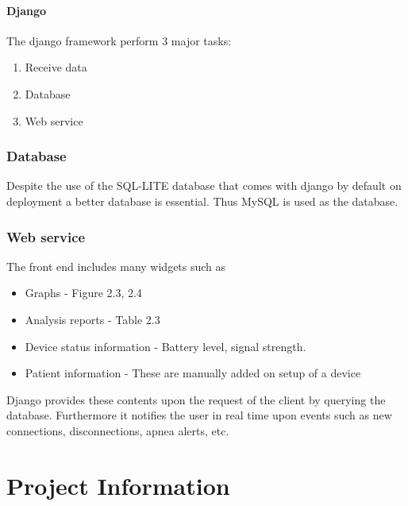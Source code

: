 \documentclass{report}
\begin{document}
\subsubsection{Django}

The django framework perform 3 major tasks:

\begin{enumerate}
    \item Receive data
    \item Database  
    \item Web service
\end{enumerate}


\subsection{Database}
Despite the use of the SQL-LITE database that comes with django by default on deployment a better database is essential. Thus MySQL is used as the database. 

\subsection{Web service} 
The front end includes many widgets such as \begin{itemize}
    \item Graphs - Figure 2.3, 2.4
    \item Analysis reports - Table 2.3
    \item Device status information - Battery level, signal strength.
    \item Patient information - These are manually added on setup of a device
\end{itemize}

Django provides these contents upon the request of the client by querying the database. Furthermore it notifies the user in real time upon events such as new connections, disconnections, apnea alerts, etc.


\chapter{Project Information}
\end{document}
